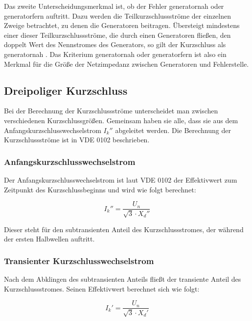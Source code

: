 \documentclass{scrartcl}
\begin{document}
\begin{onehalfspace}
Das zweite Unterscheidungsmerkmal ist, ob der Fehler \glqq generatornah\grqq{} oder \glqq generatorfern\grqq{} auftritt. Dazu werden die Teilkurzschlussströme der einzelnen Zweige betrachtet, zu denen die Generatoren beitragen. Übersteigt mindestens einer dieser Teilkurzschlussströme, die durch einen Generatoren fließen, den doppelt Wert des Nennstromes des Generators, so gilt der Kurzschluss als generatornah \cite[S. 56]{Schlabbach2003}. Das Kriterium \glqq generatornah oder generatorfern\grqq{} ist also ein Merkmal für die Größe der Netzimpedanz zwischen Generatoren und Fehlerstelle. \\

\subsection{Dreipoliger Kurzschluss}
Bei der Berechnung der Kurzschlussströme unterscheidet man zwischen verschiedenen Kurzschlussgrößen. Gemeinsam haben sie alle, dass sie aus dem Anfangskurzschlusswechselstrom $I_k''$ abgeleitet werden. %
Die Berechnung der Kurzschlussströme ist in VDE 0102 beschrieben.

\subsubsection{Anfangskurzschlusswechselstrom}
Der Anfangskurzschlusswechselstrom ist laut VDE 0102 der \glqq Effektivwert zum Zeitpunkt des Kurzschlussbeginns\grqq{} und wird wie folgt berechnet:

\begin{equation}
I_k'' = \frac{U_n}{\sqrt{3} \cdot X_d''}
\end{equation}

Dieser steht für den subtransienten Anteil des Kurzschlussstromes, der während der ersten Halbwellen auftritt.

\subsubsection{Transienter Kurzschlusswechselstrom}
Nach dem Abklingen des subtransienten Anteils fließt der transiente Anteil des Kurzschlussstromes. Seinen Effektivwert berechnet sich wie folgt:

\begin{equation}
I_k' = \frac{U_n}{\sqrt{3} \cdot X_d'}
\end{equation}


\end{onehalfspace}
\end{document}
